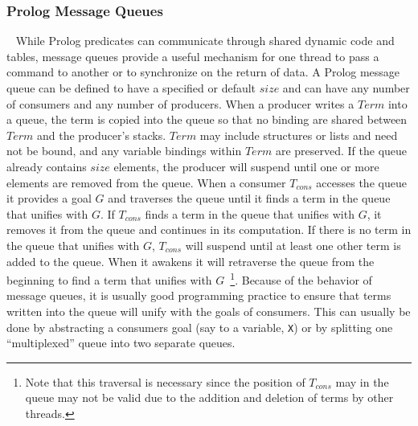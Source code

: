 \subsubsection{Prolog Message Queues}~\label{sec:message-queues}
While Prolog predicates can communicate through shared dynamic code
and tables, message queues provide a useful mechanism for one thread
to pass a command to another or to synchronize on the return of data.
A Prolog message queue can be defined to have a specified or default
$size$ and can have any number of consumers and any number of
producers.  When a producer writes a $Term$ into a queue, the term is
copied into the queue so that no binding are shared between $Term$ and
the producer's stacks.  $Term$ may include structures or lists and
need not be bound, and any variable bindings within $Term$ are
preserved.  If the queue already contains $size$ elements, the
producer will suspend until one or more elements are removed from the
queue.  When a consumer $T_{cons}$ accesses the queue it provides a
goal $G$ and traverses the queue until it finds a term in the queue
that unifies with $G$.  If $T_{cons}$ finds a term in the queue that
unifies with $G$, it removes it from the queue and continues in its
computation.  If there is no term in the queue that unifies with $G$,
$T_{cons}$ will suspend until at least one other term is added to the
queue.  When it awakens it will retraverse the queue from the
beginning to find a term that unifies with $G$~\footnote{Note that
  this traversal is necessary since the position of $T_{cons}$ may in
  the queue may not be valid due to the addition and deletion of terms
  by other threads.}.  Because of the behavior of message queues, it
is usually good programming practice to ensure that terms written into
the queue will unify with the goals of consumers.  This can usually be
done by abstracting a consumers goal (say to a variable, {\tt X}) or
by splitting one ``multiplexed'' queue into two separate queues.

